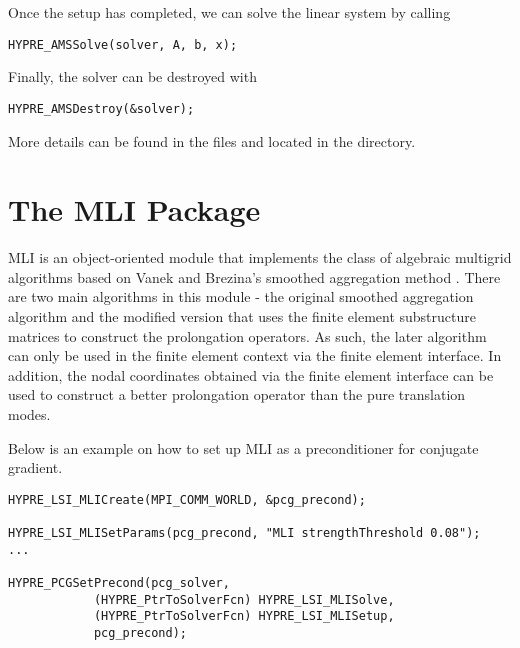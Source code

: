 \noindent
Once the setup has completed, we can solve the linear system by calling
\begin{display}\begin{verbatim}
HYPRE_AMSSolve(solver, A, b, x);
\end{verbatim}\end{display}

\noindent
Finally, the solver can be destroyed with
\begin{display}\begin{verbatim}
HYPRE_AMSDestroy(&solver);
\end{verbatim}\end{display}

\noindent
More details can be found in the files  and 
located in the  directory.


\section{The MLI Package}
                                                                                   
MLI is an object-oriented module that implements the class of algebraic
multigrid algorithms based on Vanek and Brezina's smoothed aggregation
method \cite{VaMB96, VaBM01}.  There are two main algorithms in this module - 
the original
smoothed aggregation algorithm and the modified version that uses
the finite element substructure matrices to construct the prolongation
operators.  As such, the later algorithm can only be used in the
finite element context via the finite element interface.  In addition,
the nodal coordinates obtained via the finite element interface can be
used to construct a better prolongation operator than the pure
translation modes.

Below is an example on how to set up MLI as a preconditioner
for conjugate gradient.

\begin{display}\begin{verbatim}
HYPRE_LSI_MLICreate(MPI_COMM_WORLD, &pcg_precond);

HYPRE_LSI_MLISetParams(pcg_precond, "MLI strengthThreshold 0.08");
...

HYPRE_PCGSetPrecond(pcg_solver,
		    (HYPRE_PtrToSolverFcn) HYPRE_LSI_MLISolve,
		    (HYPRE_PtrToSolverFcn) HYPRE_LSI_MLISetup,
		    pcg_precond);
\end{verbatim}\end{display}

